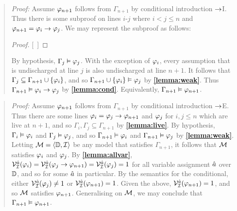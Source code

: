 \begin{quote} 
  \textit{Proof:} Assume $\varphi_{n+1}$ follows from $\Gamma_{n+1}$ by conditional introduction $\rightarrow$I.
  Thus there is some subproof on lines $i$-$j$ where $i<j\leq n$ and $\varphi_{n+1}=\varphi_i \rightarrow \varphi_j$.
  We may represent the subproof as follows:

  \begin{proof}
  \open
    \metaA {}
  \close
  [\ ]{\metaA\eif\metaB} %
  \end{proof}

  By hypothesis, $\Gamma_j \vDash \varphi_j$.
  With the exception of $\varphi_i$, every assumption that is undischarged at line $j$ is also undischarged at line $n+1$.
  It follows that $\Gamma_j\subseteq\Gamma_{n+1}\cup\lbrace\varphi_i\rbrace$, and so $\Gamma_{n+1}\cup\lbrace\varphi_i\rbrace \vDash \varphi_j$ by \textbf{\ref{lemma:weak}}.
  Thus $\Gamma_{n+1} \vDash \varphi_i \rightarrow \varphi_j$ by \textbf{\ref{lemma:cond}}.
  Equivalently, $\Gamma_{n+1} \vDash \varphi_{n+1}$.
\end{quote}





\begin{quote} 
  \textit{Proof:} Assume $\varphi_{n+1}$ follows from $\Gamma_{n+1}$ by conditional introduction $\rightarrow$E.
  Thus there are some lines $\varphi_i=\varphi_j\rightarrow\varphi_{n+1}$ and $\varphi_j$ for $i,j\leq n$ which are live at $n+1$, and so $\Gamma_i,\Gamma_j\subseteq\Gamma_{n+1}$ by \textbf{\ref{lemma:live}}.
  By hypothesis, $\Gamma_i\vDash \varphi_i$ and $\Gamma_j\vDash \varphi_j$, and so $\Gamma_{n+1} \vDash \varphi_i$ and $\Gamma_{n+1} \vDash \varphi_j$ by \textbf{\ref{lemma:weak}}.
  Letting $\mathcal{M}=\langle\mathbb{D},\mathcal{I}\rangle$ be any model that satisfies $\Gamma_{n+1}$, it follows that $\mathcal{M}$ satisfies $\varphi_i$ and $\varphi_j$.
  By \textbf{\ref{lemma:allvar}}, $\mathcal{V}_{\mathcal{I}}^{\hat{a}}(\varphi_i)=\mathcal{V}_{\mathcal{I}}^{\hat{a}}(\varphi_j\rightarrow\varphi_{n+1})=\mathcal{V}_{\mathcal{I}}^{\hat{a}}(\varphi_j)=1$ for all variable assignment $\hat{a}$ over $\mathbb{D}$, and so for some $\hat{a}$ in particular.
  By the semantics for the conditional, either $\mathcal{V}_{\mathcal{I}}^{\hat{a}}(\varphi_j)\neq 1$ or $\mathcal{V}_{\mathcal{I}}^{\hat{a}}(\varphi_{n+1})=1$.
  Given the above, $\mathcal{V}_{\mathcal{I}}^{\hat{a}}(\varphi_{n+1})=1$, and so $\mathcal{M}$ satisfies $\varphi_{n+1}$.
  Generalising on $\mathcal{M}$, we may conclude that $\Gamma_{n+1} \vDash \varphi_{n+1}$.
\end{quote}






